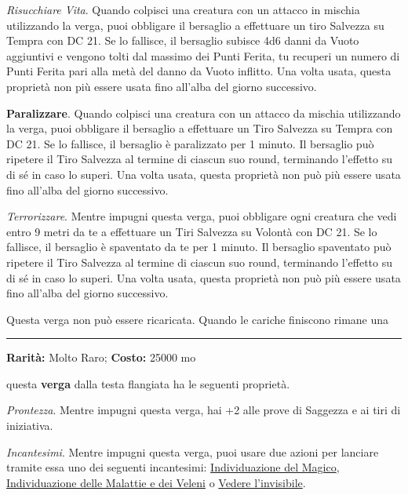 \begin{multicols}{2}
\emph{Risucchiare Vita}. Quando colpisci una creatura con un attacco in mischia utilizzando la verga, puoi obbligare il bersaglio a effettuare un tiro Salvezza su Tempra con DC 21. Se lo fallisce, il bersaglio subisce 4d6 danni da Vuoto aggiuntivi e vengono tolti dal massimo dei Punti Ferita, tu recuperi un numero di Punti Ferita pari alla metà del danno da Vuoto inflitto. Una volta usata, questa proprietà non più essere usata fino all'alba del giorno successivo.

\textbf{Paralizzare}. Quando colpisci una creatura con un attacco da mischia utilizzando la verga, puoi obbligare il bersaglio a effettuare un Tiro Salvezza su Tempra con DC 21. Se lo fallisce, il bersaglio è paralizzato per 1 minuto. Il bersaglio può ripetere il Tiro Salvezza al termine di ciascun suo round, terminando l'effetto su di sé in caso lo superi. Una volta usata, questa proprietà non può più essere usata fino all'alba del giorno successivo.

\emph{Terrorizzare}. Mentre impugni questa verga, puoi obbligare ogni creatura che vedi entro 9 metri da te a effettuare un Tiri Salvezza su Volontà con DC 21. Se lo fallisce, il bersaglio è spaventato da te per 1 minuto. Il bersaglio spaventato può ripetere il Tiro Salvezza al termine di ciascun suo round, terminando l'effetto su di sé in caso lo superi. Una volta usata, questa proprietà non può più essere usata fino all'alba del giorno successivo.

Questa verga non può essere ricaricata. Quando le cariche finiscono rimane una

\smallskip\noindent\rule{\linewidth}{2pt}  \hypertarget{VergadellaProntezza}{}\medskip{}\noindent\label{VergadellaProntezza}

\textbf{Rarità:} Molto Raro; \textbf{Costo:} 25000 mo

questa \textbf{verga} dalla testa flangiata ha le seguenti proprietà.

\emph{Prontezza}. Mentre impugni questa verga, hai +2 alle prove di Saggezza e ai tiri di iniziativa.

\emph{Incantesimi}. Mentre impugni questa verga, puoi usare due azioni per lanciare tramite essa uno dei seguenti incantesimi: \hyperlink{Bacchettadell'IndividuazionedelMagico}{Individuazione del Magico}, \hyperlink{Individuazione delle Malattie e dei Veleni}{Individuazione delle Malattie e dei Veleni} o \hyperlink{Vedere l'invisibile}{Vedere l'invisibile}.


\end{multicols}
